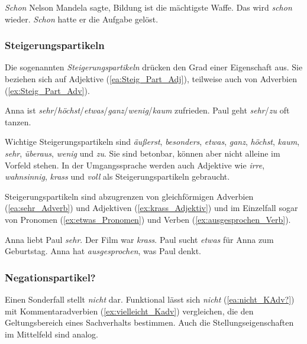 \ea \label{ea:Abgrenzung_Fokus}
\ea \label{ea:schon_Fokus} \textit{Schon} Nelson Mandela sagte, Bildung ist die mächtigste Waffe.
\ex \label{ex:schon_Abtönung2} Das wird \textit{schon} wieder.
\ex \label{ex:schon_Adverb2} \textit{Schon} hatte er die Aufgabe gelöst.
\z 
\z 


\subsubsection{Steigerungspartikeln}\label{subsubsection:Steigerung}

Die sogenannten \textit{Steigerungspartikeln} drücken den Grad einer Eigenschaft aus. Sie beziehen sich auf Adjektive (\ref{ea:Steig_Part_Adj}), teilweise auch von Adverbien (\ref{ex:Steig_Part_Adv}).

\ea \label{ea:Steigerungspartikeln}
\ea \label{ea:Steig_Part_Adj} Anna ist \textit{sehr}/\textit{höchst}/\textit{etwas}/\textit{ganz}/\textit{wenig}/\textit{kaum} zufrieden.
\ex \label{ex:Steig_Part_Adv} Paul geht \textit{sehr}/\textit{zu} oft tanzen.
\z 
\z 

Wichtige Steigerungspartikeln sind \textit{äußerst}, \textit{besonders}, \textit{etwas}, \textit{ganz}, \textit{höchst}, \textit{kaum}, \textit{sehr}, \textit{überaus}, \textit{wenig} und \textit{zu}. Sie sind betonbar, können aber nicht alleine im Vorfeld stehen. In der Umgangssprache werden auch Adjektive wie \textit{irre}, \textit{wahnsinnig}, \textit{krass} und \textit{voll} als Steigerungspartikeln gebraucht.

Steigerungspartikeln sind abzugrenzen von gleichförmigen Adverbien (\ref{ea:sehr_Adverb}) und Adjektiven (\ref{ex:krass_Adjektiv}) und im Einzelfall sogar von Pronomen (\ref{ex:etwas_Pronomen}) und Verben (\ref{ex:ausgesprochen_Verb}).

\ea \label{ea:Abgrenzung_Steigerungspartikeln}
\ea \label{ea:sehr_Adverb} Anna liebt Paul \textit{sehr}.
\ex \label{ex:krass_Adjektiv} Der Film war \textit{krass}.
\ex \label{ex:etwas_Pronomen} Paul sucht \textit{etwas} für Anna zum Geburtstag.
\ex \label{ex:ausgesprochen_Verb} Anna hat \textit{ausgesprochen}, was Paul denkt.
\z 
\z 


\subsubsection{Negationspartikel?}\label{subsubsection:Negationspartikel}

Einen Sonderfall stellt \textit{nicht} dar. Funktional lässt sich \textit{nicht} (\ref{ea:nicht_KAdv?}) mit Kommentaradverbien (\ref{ex:vielleicht_Kadv}) vergleichen, die den Geltungsbereich eines Sachverhalts bestimmen. Auch die Stellungseigenschaften im Mittelfeld sind analog.


